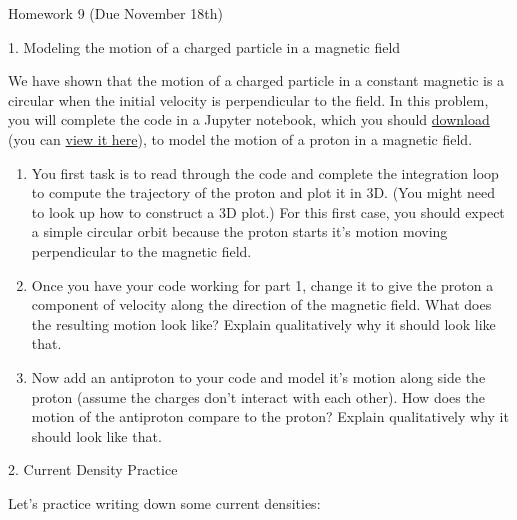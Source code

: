 \documentclass[11pt]{article}
\def\tightlist{}
\begin{document}
{\LARGE Homework 9 (Due November
18th)}\label{homework-9-due-november-18th}

{\Large 1. Modeling the motion of a charged particle in a magnetic
field}\label{modeling-the-motion-of-a-charged-particle-in-a-magnetic-field}

We have shown that the motion of a charged particle in a constant
magnetic is a circular when the initial velocity is perpendicular to the
field. In this problem, you will complete the code in a Jupyter
notebook, which you should
\href{../jupyter/HW9-MotionOfChargeInMagneticField.ipynb}{download} (you
can
\href{https://github.com/dannycab/phy481msu/blob/gh-pages/jupyter/HW9-MotionOfChargeInMagneticField.ipynb}{view
it here}), to model the motion of a proton in a magnetic field.

\begin{enumerate}
\def\labelenumi{\arabic{enumi}.}
\tightlist
\item
  You first task is to read through the code and complete the
  integration loop to compute the trajectory of the proton and plot it
  in 3D. (You might need to look up how to construct a 3D plot.) For
  this first case, you should expect a simple circular orbit because the
  proton starts it's motion moving perpendicular to the magnetic field.
\item
  Once you have your code working for part 1, change it to give the
  proton a component of velocity along the direction of the magnetic
  field. What does the resulting motion look like? Explain qualitatively
  why it should look like that.
\item
  Now add an antiproton to your code and model it's motion along side
  the proton (assume the charges don't interact with each other). How
  does the motion of the antiproton compare to the proton? Explain
  qualitatively why it should look like that.
\end{enumerate}

{\Large 2. Current Density Practice}\label{current-density-practice}

Let's practice writing down some current densities:
\end{document}
